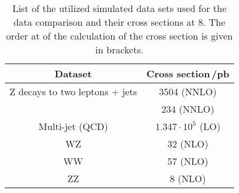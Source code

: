 
\begin{table}[h]
    \begin{center}
        \caption[List  of all data samples used for the data simulation comparison]{List of the utilized simulated data sets used for the data comparison and their cross sections at 8\TeV{}. The order at of the calculation of the cross section is given in brackets.}
        \label{tab:DCDS}
        \begin{tabular}{c c}
            Dataset & Cross section\,/\unit{pb} \\
            \midrule[2pt]
            Z decays to two leptons + jets & 3504 (NNLO)  \\
            \ttbar{} & 234 (NNLO) \\
            Multi-jet (QCD) & $1.347\cdot10^{5}$ (LO) \\
            WZ & 32 (NLO) \\
            WW & 57 (NLO) \\
            ZZ & 8 (NLO) \\
        \end{tabular}
    \end{center}
\end{table}